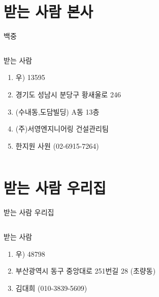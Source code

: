 \documentclass[aspectratio=1610,12pt,xcolor=pdftex,dvipsnames,table,handout]{beamer}
\begin{document}
		\section{받는 사람 본사}
	
		\begin{frame}[c,plain]{백중}

		\begin{columns}[t]
		\begin{column}{1.0\textwidth}

			\begin{block} {받는 사람}
			\begin{enumerate}
			\item [] 우) 13595
			\item [] 경기도 성남시 분당구 황새울로 246
			\item []  (수내동,도담빌딩) A동 13층
			\item [] (주)서영엔지니어링 건설관리팀
			\item [] 한지원 사원 (02-6915-7264)
			\end{enumerate}
			\end{block}

		\end{column}

		\begin{column}{.2\textwidth}
		\end{column}
		\end{columns}

		\end{frame}


		\section{받는 사람 우리집}
		\begin{frame}[c,plain]{받는 사람 우리집}

		\begin{columns}[t]
		\begin{column}{1.0\textwidth}

			\begin{block} {받는 사람}
			\begin{enumerate}
			\item [] 우) 48798
			\item [] 부산광역시 동구 중앙대로 251번길 28 (초량동)
			\item [] 김대희 (010-3839-5609)
			\end{enumerate}
			\end{block}
		\end{column}
		\end{columns}

		\end{frame}
\end{document}
